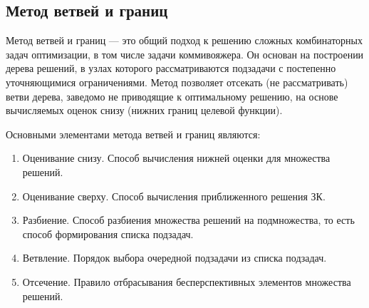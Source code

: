 \subsection{Метод ветвей и границ}
Метод ветвей и границ --- это общий подход к решению сложных комбинаторных задач оптимизации, в том числе задачи коммивояжера. Он основан на построении дерева решений, в узлах которого рассматриваются подзадачи с постепенно уточняющимися ограничениями. Метод позволяет отсекать (не рассматривать) ветви дерева, заведомо не приводящие к оптимальному решению, на основе вычисляемых оценок снизу (нижних границ целевой функции).

Основными элементами метода ветвей и границ являются:
\begin{enumerate}
    \item Оценивание снизу. Способ вычисления нижней оценки для множества решений.
    \item Оценивание сверху. Способ вычисления приближенного решения ЗК.
    \item Разбиение. Способ разбиения множества решений на подмножества, то есть способ формирования списка подзадач.
    \item Ветвление. Порядок выбора очередной подзадачи из списка подзадач.
    \item Отсечение. Правило отбрасывания бесперспективных элементов множества решений.
\end{enumerate}

